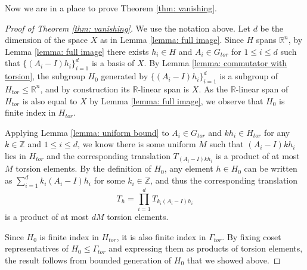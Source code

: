 \documentclass{amsart}
\theoremstyle{definition}
\numberwithin{equation}{section}
\theoremstyle{theorem}
\theoremstyle{remark}
\def\Z{\mathbb Z}
\def\R{\mathbb R}
\def\Gt{G_{tor}}
\def\Ht{H_{tor}}
\def\Gat{\Gamma_{tor}}
\begin{document}
	Now we are in a place to prove Theorem \ref{thm: vanishing}.
	\begin{proof}[Proof of Theorem \ref{thm: vanishing}]
		We use the notation above. Let $d$ be the dimension of the space $X$ as in Lemma \ref{lemma: full image}. 
		Since $H$ spans $\R^n$, by Lemma \ref{lemma: full image} there exists $h_i\in H$ and $A_i\in \Gt$ 
		for $1\le i\le d$ such that $\{(A_i-I)h_i\}_{i=1}^d$ is a basis of $X$. 
		By Lemma \ref{lemma: commutator with torsion}, the subgroup $H_0$ generated by $\{(A_i-I)h_i\}_{i=1}^d$ is a subgroup of $\Ht\le \R^n$, and by construction its $\R$-linear span is $X$.
		As the $\R$-linear span of $\Ht$ is also equal to $X$ by Lemma \ref{lemma: full image}, we observe that $H_0$ is finite index in $\Ht$.
		
		Applying Lemma \ref{lemma: uniform bound} to $A_i\in \Gt$ and $kh_i\in \Ht$ for any $k\in\Z$ and $1\le i\le d$,
		we know there is some uniform $M$ such that $(A_i-I)kh_i$ lies in $\Ht$ and the corresponding translation $T_{(A_i-I)kh_i}$ is a product of at most $M$ torsion elements. 
		By the definition of $H_0$, any element $h\in H_0$ can be written as $\sum_{i=1}^d k_i(A_i-I)h_i$ for some $k_i\in\Z$, and thus the corresponding translation 
		$$T_h=\prod_{i=1}^d T_{k_i(A_i-I)h_i}$$ 
		is a product of at most $dM$ torsion elements.
		
		Since $H_0$ is finite index in $\Ht$, it is also finite index in $\Gat$. By fixing coset representatives of $H_0\le \Gat$ and expressing them as products of torsion elements, the result follows from bounded generation of $H_0$ that we showed above.
	\end{proof}
	
\end{document}
